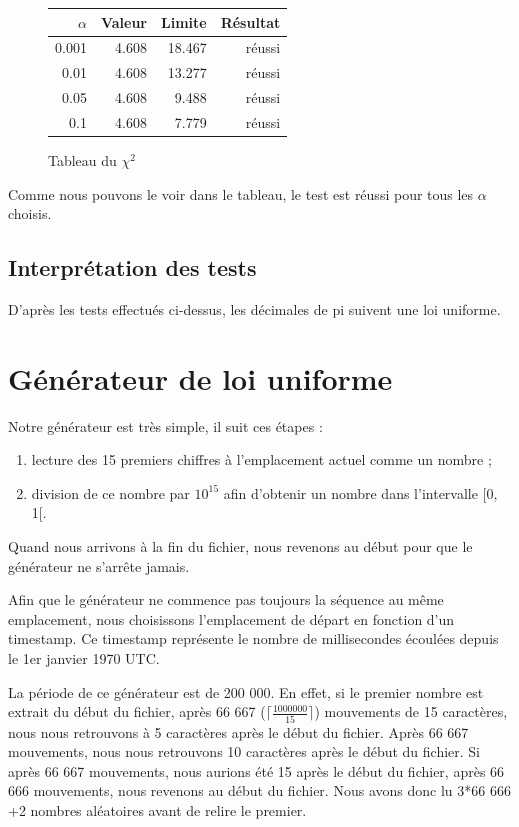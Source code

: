 \documentclass[10pt,a4paper]{article}
\begin{document}
	\begin{figure}[h]
		\centering
		\begin{tabular}{|r|r|r|r|}
			\hline
			$\alpha$ & Valeur & Limite & Résultat\\
			\hline
			0.001 & 4.608 & 18.467 & réussi\\
			0.01 & 4.608 & 13.277 & réussi\\
			0.05 & 4.608 & 9.488 & réussi\\
			0.1 & 4.608 & 7.779 & réussi\\
			\hline
		\end{tabular}
		\caption{Tableau du $\chi^2$}
	\end{figure}
	
	Comme nous pouvons le voir dans le tableau, le test est réussi pour tous les $\alpha$ choisis.
	
	\newpage
	\subsection{Interprétation des tests}
	D'après les tests effectués ci-dessus, les décimales de pi suivent une loi uniforme.
	
	\newpage
	\section{Générateur de loi uniforme}
	Notre générateur est très simple, il suit ces étapes :
	\begin{enumerate}
		\item lecture des 15 premiers chiffres à l'emplacement actuel comme un nombre ;
		\item division de ce nombre par $10^{15}$ afin d'obtenir un nombre dans l'intervalle [0, 1[.
	\end{enumerate}
	Quand nous arrivons à la fin du fichier, nous revenons au début pour que le générateur ne s'arrête jamais.
	
	Afin que le générateur ne commence pas toujours la séquence au même emplacement, nous choisissons l'emplacement de départ en fonction d'un timestamp.
	Ce timestamp représente le nombre de millisecondes écoulées depuis le 1er janvier 1970 UTC.
	
	La période de ce générateur est de 200 000.
	En effet, si le premier nombre est extrait du début du fichier, après 66 667 ($\lceil\frac{1 000 000}{15}\rceil$) mouvements de 15 caractères, nous nous retrouvons à 5 caractères après le début du fichier.
	Après 66 667 mouvements, nous nous retrouvons 10 caractères après le début du fichier.
	Si après 66 667 mouvements, nous aurions été 15 après le début du fichier, après 66 666 mouvements, nous revenons au début du fichier.
	Nous avons donc lu 3*66 666 +2 nombres aléatoires avant de relire le premier.
	
\end{document}
